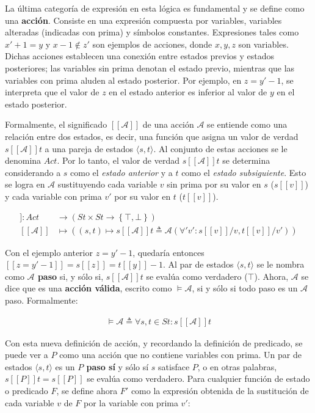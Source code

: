 La última categoría de expresión en esta lógica es fundamental y se define como una \textbf{acción}. Consiste en una expresión compuesta por variables, variables alteradas (indicadas con prima) y símbolos constantes. Expresiones tales como $x' + 1 = y$ y $x-1 \not \in z'$ son ejemplos de acciones, donde $x,y,z$ son variables. Dichas acciones establecen una conexión entre estados previos y estados posteriores; las variables sin prima denotan el estado previo, mientras que las variables con prima aluden al estado posterior. Por ejemplo, en $z = y' - 1$, se interpreta que el valor de $z$ en el estado anterior es inferior al valor de $y$ en el estado posterior.

Formalmente, el significado $[[\mathcal{A}]]$ de una acción $\mathcal{A}$ se entiende como una relación entre dos estados, es decir, una función que asigna un valor de verdad $s[[\mathcal{A}]]t$ a una pareja de estados $\langle s,t \rangle$. Al conjunto de estas acciones se le denomina $Act$. Por lo tanto, el valor de verdad $s[[\mathcal{A}]]t$ se determina considerando a $s$ como el \textit{estado anterior} y a $t$ como el \textit{estado subsiguiente}. Esto se logra en $\mathcal{A}$ sustituyendo cada variable $v$ sin prima por su valor en $s$ ($s[[v]]$) y cada variable con prima $v'$ por su valor en $t$ ($t[[v]]$).

\begin{align*}
[[\cdot]] : Act &\to (St \times St \to \left\lbrace \top, \bot \right\rbrace) \\
[[\mathcal{A}]] &\mapsto ((s,t) \mapsto s[[\mathcal{A}]]t \triangleq \mathcal{A}(\forall 'v' : s[[v]] / v, t[[v]] / v'))
\end{align*}

Con el ejemplo anterior $z = y' - 1$, quedaría entonces $[[z = y' - 1 ]] = s[[z]] = t[[y]] - 1$. Al par de estados $\langle s,t\rangle$ se le nombra como \textbf{$\mathcal{A}$ paso} si, y sólo si, $s[[\mathcal{A}]]t$ se evalúa como verdadero ($\top$). Ahora, $\mathcal{A}$ se dice que es una \textbf{acción válida}, escrito como $\models \mathcal{A}$, si y sólo si todo paso es un $\mathcal{A}$ paso. Formalmente:

\begin{align}
\models \mathcal{A} \triangleq \forall s,t \in St : s[[\mathcal{A}]]t
\end{align}

Con esta nueva definición de acción, y recordando la definición de predicado, se puede ver a $P$ como una acción que no contiene variables con prima. Un par de estados $\langle s,t \rangle$ es un \textbf{$P$ paso sí} y sólo sí $s$ satisface $P$, o en otras palabras, $s[[P]]t = s[[P]]$ se evalúa como verdadero. Para cualquier función de estado o predicado $F$, se define ahora $F'$ como la expresión obtenida de la sustitución de cada variable $v$ de $F$ por la variable con prima $v'$:

